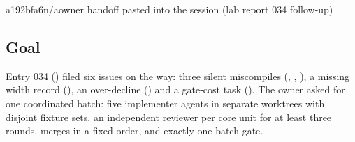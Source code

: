%
  {a192bfa6}{n/a}{owner handoff pasted into the session (lab report 034 follow-up)}

\subsection*{Goal}
Entry 034 () filed six issues on the way: three silent
miscompiles (, ,
), a missing width record
(), an over-decline
() and a gate-cost task
(). The owner asked for one coordinated batch:
five implementer agents in separate worktrees with disjoint fixture sets, an
independent reviewer per core unit for at least three rounds, merges in a fixed
order, and exactly one batch gate.

